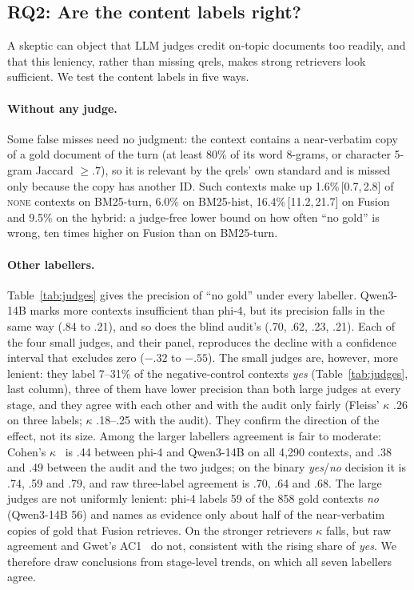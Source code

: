 \documentclass[11pt]{article}
\newcommand{\ci}[2]{\,{\scriptsize[#1,\,#2]}}
\newcommand{\qnone}{\textnormal{\textsc{none}}}
\newcommand{\cno}{\textit{no}}
\newcommand{\cyes}{\textit{yes}}
\begin{document}
\subsection{RQ2: Are the content labels right?}
\label{sec:rq2}

A skeptic can object that LLM judges credit on-topic documents too readily, and that this leniency, rather than missing qrels, makes strong retrievers look sufficient. We test the content labels in five ways.

\paragraph{Without any judge.}
Some false misses need no judgment: the context contains a near-verbatim copy of a gold document of the turn (at least 80\% of its word 8-grams, or character 5-gram Jaccard ${\geq}.7$), so it is relevant by the qrels' own standard and is missed only because the copy has another ID. Such contexts make up 1.6\%\ci{0.7}{2.8} of \qnone{} contexts on BM25-turn, 6.0\% on BM25-hist, 16.4\%\ci{11.2}{21.7} on Fusion and 9.5\% on the hybrid: a judge-free lower bound on how often ``no gold'' is wrong, ten times higher on Fusion than on BM25-turn.

\paragraph{Other labellers.}
Table~\ref{tab:judges} gives the precision of ``no gold'' under every labeller. Qwen3-14B marks more contexts insufficient than phi-4, but its precision falls in the same way (.84 to .21), and so does the blind audit's (.70, .62, .23, .21). Each of the four small judges, and their panel, reproduces the decline with a confidence interval that excludes zero ($-.32$ to $-.55$). The small judges are, however, more lenient: they label 7--31\% of the negative-control contexts \cyes{} (Table~\ref{tab:judges}, last column), three of them have lower precision than both large judges at every stage, and they agree with each other and with the audit only fairly (Fleiss' $\kappa$ .26 on three labels; $\kappa$ .18--.25 with the audit). They confirm the direction of the effect, not its size. Among the larger labellers agreement is fair to moderate: Cohen's $\kappa$~\cite{cohen1960coefficient} is .44 between phi-4 and Qwen3-14B on all 4{,}290 contexts, and .38 and .49 between the audit and the two judges; on the binary \cyes/\cno{} decision it is .74, .59 and .79, and raw three-label agreement is .70, .64 and .68. The large judges are not uniformly lenient: phi-4 labels 59 of the 858 gold contexts \cno{} (Qwen3-14B 56) and names as evidence only about half of the near-verbatim copies of gold that Fusion retrieves. On the stronger retrievers $\kappa$ falls, but raw agreement and Gwet's AC1~\cite{gwet2008computing} do not, consistent with the rising share of \cyes. We therefore draw conclusions from stage-level trends, on which all seven labellers agree.
\end{document}
